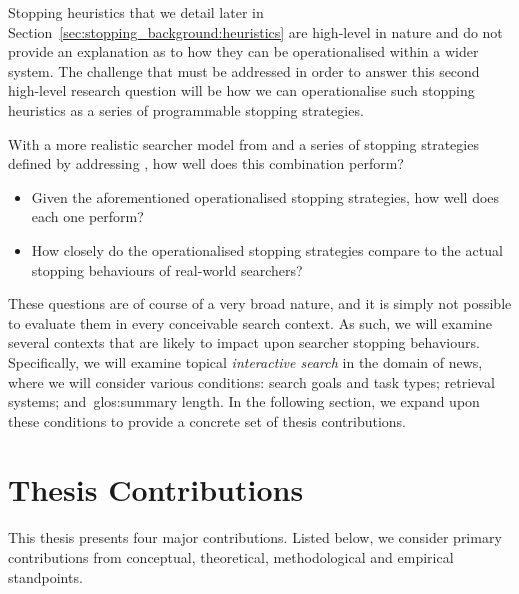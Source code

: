 Stopping heuristics that we detail later in Section~\ref{sec:stopping_background:heuristics} are high-level in nature and do not provide an explanation as to how they can be operationalised within a wider system. The challenge that must be addressed in order to answer this second high-level research question will be how we can operationalise such stopping heuristics as a series of programmable stopping strategies.

With a more realistic searcher model from  and a series of stopping strategies defined by addressing , how well does this combination perform?

\begin{itemize}
    \item{ Given the aforementioned operationalised stopping strategies, how well does each one perform?}
    \item{ How closely do the operationalised stopping strategies compare to the actual stopping behaviours of real-world searchers?}
\end{itemize}

These questions are of course of a very broad nature, and it is simply not possible to evaluate them in every conceivable search context. As such, we will examine several contexts that are likely to impact upon searcher stopping behaviours. Specifically, we will examine topical \emph{interactive search} in the domain of news, where we will consider various conditions: search goals and task types; retrieval systems; and~\gls{glos:summary} length. In the following section, we expand upon these conditions to provide a concrete set of thesis contributions.

\section{Thesis Contributions}\label{sec:intro:contribs}
This thesis presents four major contributions. Listed below, we consider primary contributions from conceptual, theoretical, methodological and empirical standpoints.


